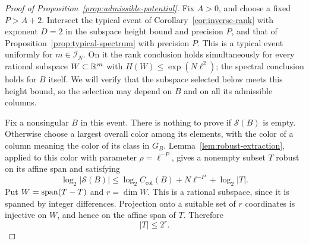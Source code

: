 \begin{proof}[Proof of Proposition~\ref{prop:admissible-potential}]
Fix \(A>0\), and choose a fixed \(P>A+2\). Intersect the typical
event of Corollary~\ref{cor:inverse-rank} with exponent \(D=2\) in the
subspace height bound and precision \(P\), and that of
Proposition~\ref{prop:typical-spectrum} with precision \(P\).
This is a typical event uniformly for \(m\in\mathcal I_N\).
On it the rank conclusion holds simultaneously for every rational
subspace \(W\subset\mathbb R^m\) with \(H(W)\le\exp(N\ell^2)\); the
spectral conclusion holds for \(B\) itself. We will verify that
the subspace selected below meets this height bound, so the
selection may depend on \(B\) and on all its admissible columns.

Fix a nonsingular \(B\) in this event. There is nothing to prove
if \(\mathcal S(B)\) is empty. Otherwise choose a largest overall
color among its elements, with the color of a column meaning the
color of its class in \(G_B\). Lemma~\ref{lem:robust-extraction},
applied to this color with parameter \(\rho=\ell^{-P}\), gives a
nonempty subset \(T\) robust on its affine span and satisfying
\begin{equation}\label{eq:discriminant-size-loss}
 \log_2|\mathcal S(B)|
 \le \log_2 C_{\mathrm{col}}(B)+N\ell^{-P}+\log_2|T|.
\end{equation}
Put \(W=\operatorname{span}(T-T)\) and \(r=\dim W\). This is a rational
subspace, since it is spanned by integer differences. Projection
onto a suitable set of \(r\) coordinates is injective on \(W\),
and hence on the affine span of \(T\). Therefore
\begin{equation}\label{eq:discriminant-cube-dimension}
 |T|\le2^r.
\end{equation}


\end{proof}

